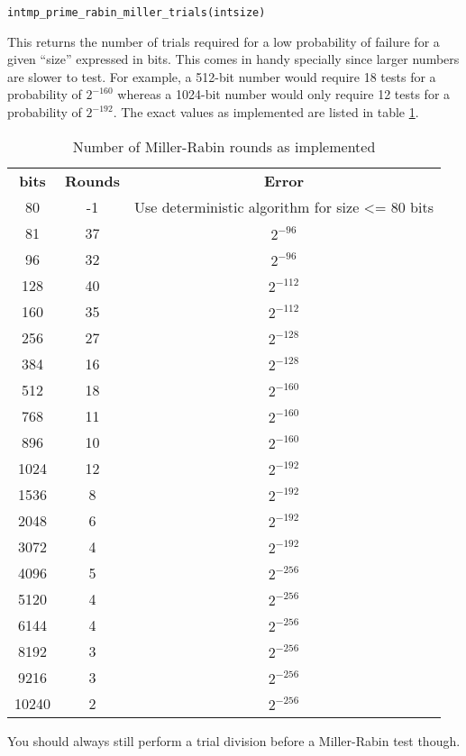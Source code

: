 \documentclass[synpaper]{book}
\begin{document}
\begin{alltt}
int mp_prime_rabin_miller_trials(int size)
\end{alltt}
This returns the number of trials required for a low probability of failure for a given ``size'' expressed in bits.  This comes in handy specially since larger numbers are slower to test. For example, a 512-bit number would require 18 tests for a probability of $2^{-160}$ whereas a 1024-bit number would only require 12 tests for a probability of $2^{-192}$. The exact values as implemented are listed in table \ref{table:millerrabinrunsimpl}.

\begin{table}[h]
\begin{center}
\begin{tabular}{c c c}
\textbf{bits} & \textbf{Rounds} & \textbf{Error}\\
 80 & -1  &  Use deterministic algorithm for size <= 80 bits \\
 81 & 37  &  $2^{-96}$ \\
 96 & 32  & $2^{-96}$ \\
 128 & 40  & $2^{-112}$ \\
 160 & 35  & $2^{-112}$ \\
 256 & 27  & $2^{-128}$ \\
 384 & 16  & $2^{-128}$ \\
 512 & 18  & $2^{-160}$ \\
 768 & 11  & $2^{-160}$ \\
 896 & 10  & $2^{-160}$ \\
 1024 & 12  & $2^{-192}$ \\
 1536 & 8   & $2^{-192}$ \\
 2048 & 6   & $2^{-192}$ \\
 3072 & 4   & $2^{-192}$ \\
 4096 & 5   & $2^{-256}$ \\
 5120 & 4   & $2^{-256}$ \\
 6144 & 4   & $2^{-256}$ \\
 8192 & 3   & $2^{-256}$ \\
 9216 & 3   & $2^{-256}$ \\
 10240 & 2  & $2^{-256}$
\end{tabular}
\caption{ Number of Miller-Rabin rounds as implemented } \label{table:millerrabinrunsimpl}
\end{center}
\end{table}

You should always still perform a trial division before a Miller-Rabin test though.
\end{document}
